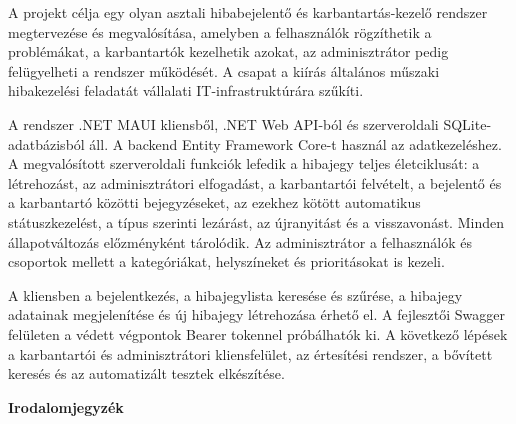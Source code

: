 \documentclass[12pt, a4paper, twoside]{article}
\begin{document}
A projekt célja egy olyan asztali hibabejelentő és karbantartás-kezelő rendszer megtervezése és megvalósítása, amelyben a felhasználók rögzíthetik a problémákat, a karbantartók kezelhetik azokat, az adminisztrátor pedig felügyelheti a rendszer működését. A csapat a kiírás általános műszaki hibakezelési feladatát vállalati IT-infrastruktúrára szűkíti.

A rendszer .NET MAUI kliensből, .NET Web API-ból és szerveroldali SQLite-adatbázisból áll. A backend Entity Framework Core-t használ az adatkezeléshez. A megvalósított szerveroldali funkciók lefedik a hibajegy teljes életciklusát: a létrehozást, az adminisztrátori elfogadást, a karbantartói felvételt, a bejelentő és a karbantartó közötti bejegyzéseket, az ezekhez kötött automatikus státuszkezelést, a típus szerinti lezárást, az újranyitást és a visszavonást. Minden állapotváltozás előzményként tárolódik. Az adminisztrátor a felhasználók és csoportok mellett a kategóriákat, helyszíneket és prioritásokat is kezeli.

A kliensben a bejelentkezés, a hibajegylista keresése és szűrése, a hibajegy adatainak megjelenítése és új hibajegy létrehozása érhető el. A fejlesztői Swagger felületen a védett végpontok Bearer tokennel próbálhatók ki. A következő lépések a karbantartói és adminisztrátori kliensfelület, az értesítési rendszer, a bővített keresés és az automatizált tesztek elkészítése.

\newpage
\clearpage

\renewcommand{\bibsection}{}

\begin{center}
    \noindent
    {\headingFont\bfseries\fontsize{16}{24}\selectfont Irodalomjegyzék}
\end{center}
\vspace{12pt}



\end{document}
